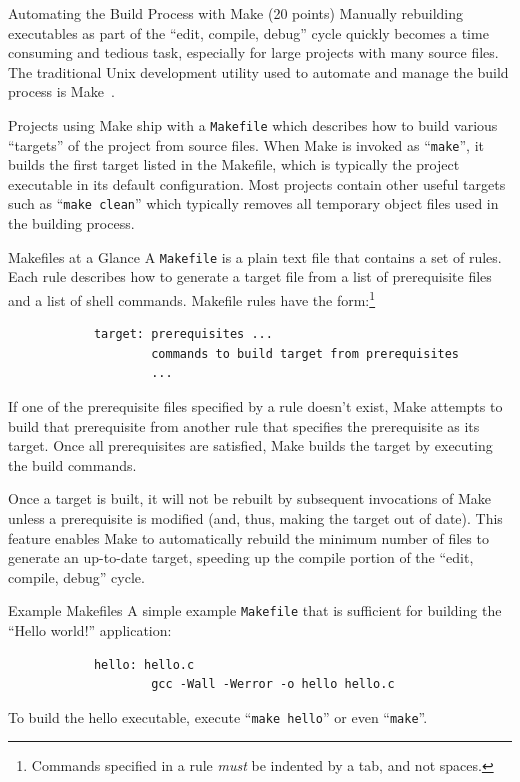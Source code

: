 \documentclass{article}
\begin{document}
	\begin{section}{Automating the Build Process with Make (20 points)}\label{makefile}
		Manually rebuilding executables as part of the ``edit, compile, debug''
		cycle quickly becomes a time consuming and tedious task, especially for
		large projects with many source files.  The traditional Unix development
		utility used to automate and manage the build process is
		Make~\cite{FSF:GNUMake}.

		Projects using Make ship with a \texttt{Makefile} which describes how to
		build various ``targets'' of the project from source files.  When Make is
		invoked as ``\texttt{make}'', it builds the first target listed in the
		Makefile, which is typically the project executable in its default
		configuration.  Most projects contain other useful targets such as
		``\texttt{make clean}'' which typically removes all temporary object files
		used in the building process.

		\begin{subsection}{Makefiles at a Glance}
			A \texttt{Makefile} is a plain text file that contains a set of rules.
			Each rule describes how to generate a target file from a list of
			prerequisite files and a list of shell commands.  Makefile rules have the
			form:\footnote{Commands specified in a rule \emph{must} be indented by a
			tab, and not spaces.}
			\begin{verbatim}
			target: prerequisites ...
			        commands to build target from prerequisites
			        ...
			\end{verbatim}
			If one of the prerequisite files specified by a rule doesn't exist, Make
			attempts to build that prerequisite from another rule that specifies the
			prerequisite as its target.  Once all prerequisites are satisfied, Make
			builds the target by executing the build commands.

			Once a target is built, it will not be rebuilt by subsequent invocations of
			Make unless a prerequisite is modified (and, thus, making the target out of
			date).  This feature enables Make to automatically rebuild the minimum
			number of files to generate an up-to-date target, speeding up the compile
			portion of the ``edit, compile, debug'' cycle.
		\end{subsection}

		\begin{subsection}{Example Makefiles}
			A simple example \texttt{Makefile} that is sufficient for building
			the ``Hello world!'' application:
			\begin{verbatim}
			hello: hello.c
			        gcc -Wall -Werror -o hello hello.c
			\end{verbatim}
			To build the hello executable, execute ``\verb|make hello|'' or even
			``\verb|make|''.


\end{subsection}
\end{section}
\end{document}
